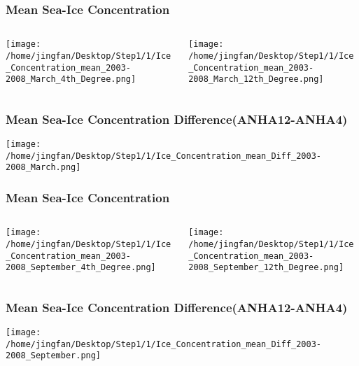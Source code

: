 \documentclass{beamer}
\begin{document}
\begin{frame}
\frametitle{Mean Sea-Ice Concentration}

\begin{columns}
\begin{column}[t]{0.5\linewidth}
\centering
\texttt{[image: /home/jingfan/Desktop/Step1/1/Ice\_Concentration\_mean\_2003-2008\_March\_4th\_Degree.png]}
\end{column}
\begin{column}[t]{0.5\linewidth}
\centering
\texttt{[image: /home/jingfan/Desktop/Step1/1/Ice\_Concentration\_mean\_2003-2008\_March\_12th\_Degree.png]}
\end{column}
\end{columns}

\end{frame}

\begin{frame}
\frametitle{Mean Sea-Ice Concentration Difference(ANHA12-ANHA4)}

\texttt{[image: /home/jingfan/Desktop/Step1/1/Ice\_Concentration\_mean\_Diff\_2003-2008\_March.png]}

\end{frame}

\begin{frame}
\frametitle{Mean Sea-Ice Concentration}

\begin{columns}
\begin{column}[t]{0.5\linewidth}
\centering
\texttt{[image: /home/jingfan/Desktop/Step1/1/Ice\_Concentration\_mean\_2003-2008\_September\_4th\_Degree.png]}
\end{column}
\begin{column}[t]{0.5\linewidth}
\centering
\texttt{[image: /home/jingfan/Desktop/Step1/1/Ice\_Concentration\_mean\_2003-2008\_September\_12th\_Degree.png]}
\end{column}
\end{columns}

\end{frame}

\begin{frame}
\frametitle{Mean Sea-Ice Concentration Difference(ANHA12-ANHA4)}

\texttt{[image: /home/jingfan/Desktop/Step1/1/Ice\_Concentration\_mean\_Diff\_2003-2008\_September.png]}

\end{frame}
\end{document}
